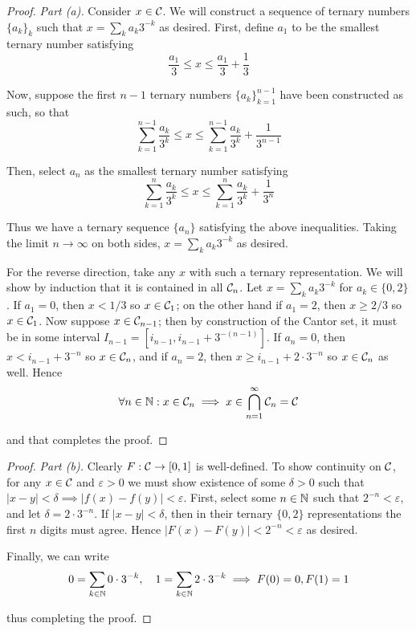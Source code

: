 \begin{proof}
    \textit{Part (a).} Consider \(x \in \mathcal{C}\). We will construct a sequence of ternary numbers \(\{a_k\}_k\) such that \(x = \sum_k a_k 3^{-k}\) as desired. First, define \(a_1\) to be the smallest ternary number satisfying 
    \[
        \frac{a_1}{3} \leq x \leq \frac{a_1}{3} + \frac{1}{3}
    \]

    Now, suppose the first \(n-1\) ternary numbers \(\{a_k\}_{k=1}^{n-1}\) have been constructed as such, so that 
    \[
    \sum_{k=1}^{n-1} \frac{a_k}{3^k} \leq x \leq \sum_{k=1}^{n-1} \frac{a_k}{3^k} + \frac{1}{3^{n-1}}
    \]

    Then, select \(a_n\) as the smallest ternary number satisfying 
    \[
    \sum_{k=1}^{n} \frac{a_k}{3^k} \leq x \leq \sum_{k=1}^n \frac{a_k}{3^k} + \frac{1}{3^n}
    \]

    Thus we have a ternary sequence \(\{a_n\}\) satisfying the above inequalities. Taking the limit \(n \to \infty\) on both sides, \(x = \sum_k a_k 3^{-k}\) as desired. 
    \stdvspace

    For the reverse direction, take any \(x\) with such a ternary representation. We will show by induction that it is contained in all \(\mathcal{C}_n\). Let \(x = \sum_k a_k 3^{-k}\) for \(a_k\in \{0, 2\}\). If \(a_1 = 0\), then \(x < 1/3\) so \(x \in \mathcal{C}_1\); on the other hand if \(a_1 = 2\), then \(x \geq 2/3\) so \(x \in \mathcal{C}_1\). Now suppose \(x \in \mathcal{C}_{n-1}\); then by construction of the Cantor set, it must be in some interval \(I_{n-1} = [i_{n-1}, i_{n-1} + 3^{-(n-1)}]\). If \(a_n = 0\), then \(x < i_{n-1} + 3^{-n}\) so \(x \in \mathcal{C}_n\), and if \(a_n = 2\), then \(x \geq i_{n-1} + 2 \cdot 3^{-n}\) so \(x \in \mathcal{C}_n\) as well. Hence
    \[
    \forall n \in \mathbb{N} : x \in \mathcal{C}_n \implies x \in \bigcap_{n=1}^\infty \mathcal{C}_n = \mathcal{C}
    \]

    and that completes the proof. 
\end{proof}

\begin{proof}
    \textit{Part (b).} Clearly \(F : \mathcal{C} \to [0, 1]\) is well-defined. To show continuity on \(\mathcal{C}\), for any \(x \in \mathcal{C}\) and \(\varepsilon > 0\) we must show existence of some \(\delta > 0\) such that \(|x - y| < \delta \implies |f(x) - f(y)| < \varepsilon\). First, select some \(n \in \mathbb{N}\) such that \(2^{-n} < \varepsilon\), and let \(\delta = 2 \cdot 3^{-n}\). If \(|x - y| < \delta\), then in their ternary \(\{0, 2\}\) representations the first \(n\) digits must agree. Hence \(|F(x) - F(y)| < 2^{-n} < \varepsilon\) as desired. 
    \stdvspace

    Finally, we can write 
    \[
    0 = \sum_{k \in \mathbb{N}} 0 \cdot 3^{-k}, \quad 1 = \sum_{k \in \mathbb{N}} 2 \cdot 3^{-k}
    \implies F(0) = 0, F(1) = 1
    \]

    thus completing the proof. 
\end{proof}

